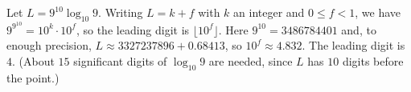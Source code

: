 Let $L=9^{10}\log_{10}9$. Writing $L=k+f$ with $k$ an integer and $0\le f<1$, we have $9^{9^{10}}=10^k\cdot10^f$, so the leading digit is $\lfloor10^f\rfloor$. Here $9^{10}=3486784401$ and, to enough precision, $L\approx3327237896+0.68413$, so $10^f\approx4.832$. The leading digit is $\boxed{4}$. (About $15$ significant digits of $\log_{10}9$ are needed, since $L$ has $10$ digits before the point.)

